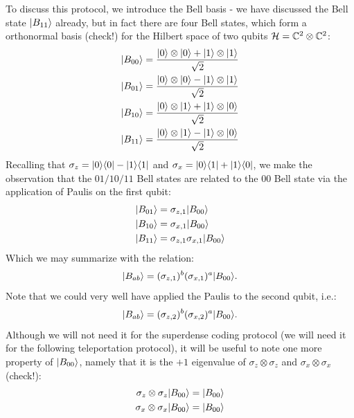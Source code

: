 To discuss this protocol, we introduce the Bell basis - we have discussed the Bell state $\lvert B_{11} \rangle$ already, but in fact there are four Bell states, which form a orthonormal basis (check!) for the Hilbert space of two qubits $\mathcal{H} = \mathbb{C}^2 \otimes \mathbb{C}^2$:
\begin{equation}
    \begin{split}
        \lvert B_{00} \rangle &= \frac{\lvert 0 \rangle\otimes \lvert 0 \rangle + \lvert 1 \rangle \otimes \lvert 1 \rangle}{\sqrt{2}}
        \\ \lvert B_{01} \rangle &= \frac{\lvert 0 \rangle\otimes \lvert 0 \rangle - \lvert 1 \rangle \otimes \lvert 1 \rangle}{\sqrt{2}}
        \\ \lvert B_{10} \rangle &= \frac{\lvert 0 \rangle\otimes \lvert 1 \rangle + \lvert 1 \rangle \otimes \lvert 0 \rangle}{\sqrt{2}}
        \\ \lvert B_{11} \rangle &= \frac{\lvert 0 \rangle\otimes \lvert 1 \rangle - \lvert 1 \rangle \otimes \lvert 0 \rangle}{\sqrt{2}}
    \end{split}
\end{equation}
Recalling that $\sigma_z = \lvert 0 \rangle \langle 0 \rvert - \lvert 1 \rangle \langle 1 \rvert$ and $\sigma_x = \lvert 0 \rangle \langle 1 \rvert + \lvert 1 \rangle \langle 0 \rvert$, we make the observation that the $01/10/11$ Bell states are related to the $00$ Bell state via the application of Paulis on the first qubit:
\begin{equation}\label{eq-BellstatePaulis}
    \begin{split}
        \lvert B_{01} \rangle &= \sigma_{z, 1}\lvert B_{00} \rangle
        \\ \lvert B_{10} \rangle &= \sigma_{x, 1}\lvert B_{00} \rangle
        \\ \lvert B_{11} \rangle &= \sigma_{z, 1}\sigma_{x, 1}\lvert B_{00} \rangle
    \end{split}
\end{equation}
Which we may summarize with the relation:
\begin{equation}
    \lvert B_{ab} \rangle = (\sigma_{z, 1})^b(\sigma_{x, 1})^a\lvert B_{00} \rangle.
\end{equation}
Note that we could very well have applied the Paulis to the second qubit, i.e.:
\begin{equation}
    \lvert B_{ab} \rangle = (\sigma_{z, 2})^b(\sigma_{x, 2})^a\lvert B_{00} \rangle.
\end{equation}
Although we will not need it for the superdense coding protocol (we will need it for the following teleportation protocol), it will be useful to note one more property of $\lvert B_{00} \rangle$, namely that it is the $+1$ eigenvalue of $\sigma_z \otimes \sigma_z$ and $\sigma_x \otimes \sigma_x$ (check!):
\begin{equation}\label{eq-Bellstabilizers}
    \begin{split}
    \sigma_z \otimes \sigma_z \lvert B_{00} \rangle &= \lvert B_{00} \rangle
    \\ \sigma_x \otimes \sigma_x \lvert B_{00} \rangle &= \lvert B_{00} \rangle
    \end{split}
\end{equation}
